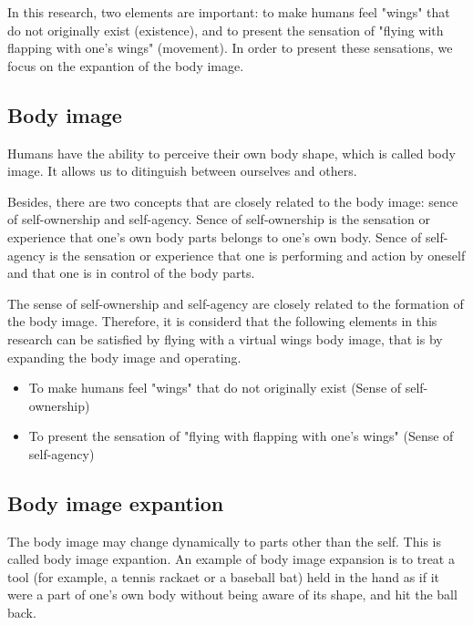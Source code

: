 \documentclass[letterpaper, 10 pt, conference]{ieeeconf}  %
\begin{document}
        In this research, two elements are important: to make humans feel "wings" that do not originally exist (existence), and to present the sensation of "flying with flapping with one's wings" (movement).  
        In order to present these sensations, we focus on the expantion of the body image.  

        \subsection{Body image}
                Humans have the ability to perceive their own body shape, which is called body image.  
                It allows us to ditinguish between ourselves and others.

                Besides, there are two concepts that are closely related to the body image: sence of self-ownership and self-agency.
                Sence of self-ownership is the sensation or experience that one's own body parts belongs to one's own body.  
                Sence of self-agency is the sensation or experience that one is performing and action by oneself and that one is in control of the body parts.  
                
                The sense of self-ownership and self-agency are closely related to  the formation of the body image.  
                Therefore, it is considerd that the following elements in this research can be satisfied by flying with a virtual wings body image, that is by expanding the body image and operating.  

                \begin{itemize}
                        \item To make humans feel "wings" that do not originally exist (Sense of self-ownership)
                        \item To present the sensation of "flying with flapping with one's wings" (Sense of self-agency)
                \end{itemize}

        \subsection{Body image expantion}
                The body image may change dynamically to parts other than the self.  
                This is called body image expantion.  
                An example of body image expansion is to treat a tool (for example, a tennis rackaet or a baseball bat) held in the hand as if it were a part of one's own body without being aware of its shape, and hit the ball back.
\end{document}
